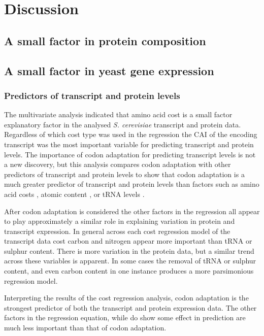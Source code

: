 \section{Discussion}

\subsection{A small factor in protein composition}

\subsection{A small factor in yeast gene expression}

\subsubsection{Predictors of transcript and protein levels}

The multivariate analysis indicated that amino acid cost is a small factor explanatory factor in the analysed \emph{S. cerevisiae} transcript and protein data. Regardless of which cost type was used in the regression the CAI of the encoding transcript was the most important variable for predicting transcript and protein levels.  The importance of codon adaptation for predicting transcript levels is not a new discovery, but this analysis compares codon adaptation  with other predictors of transcript and protein levels to show that codon adaptation is a much greater predictor of transcript and protein levels than factors such as amino acid costs \cite{akashi2002}, atomic content \cite{atomic_content}, or tRNA levels \cite{akashi_trna}.

After codon adaptation is considered the other factors in the regression all appear to play approximately a similar role in explaining variation in protein and transcript expression. In general across each cost regression model of the transcript data cost carbon and nitrogen appear more important than tRNA or sulphur content. There is more variation in the protein data, but a similar trend across these variables is apparent. In some cases the removal of tRNA or sulphur content, and even carbon content in one instance produces a more parsimonious regression model. 

Interpreting the results of the cost regression analysis, codon adaptation is the strongest predictor of both the transcript and protein expression data. The other factors in the regression equation, while do show some effect in prediction are much less important than that of codon adaptation.


